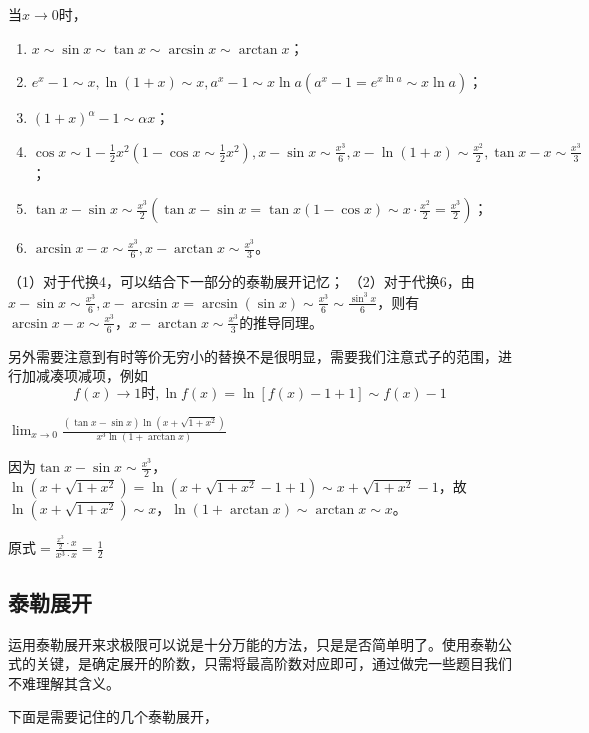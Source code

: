 当$x\to 0$时，
\begin{enumerate}
	\item $x \sim \sin x \sim \tan x \sim \arcsin x \sim \arctan x $；
	\item $e^x-1\sim x,\ln(1+x)\sim x,a^x-1 \sim x \ln a(a^x-1=e^{x \ln a} \sim x \ln a)$；
	\item $(1+x)^\alpha-1 \sim \alpha x$；
	\item $\cos x \sim 1-\frac{1}{2} x^2(1-\cos x \sim \frac{1}{2} x^2),x-\sin x \sim \frac{x^3}{6},x-\ln(1+x)\sim \frac{x^2}{2},\tan x-x\sim \frac{x^3}{3}$；
	\item $\tan x-\sin x \sim \frac{x^3}{2}(\tan x-\sin x=\tan x (1-\cos x)\sim x \cdot \frac{x^2}{2}=\frac{x^3}{2})$；
	\item $\arcsin x-x \sim \frac{x^3}{6},x-\arctan x \sim \frac{x^3}{3}$。
\end{enumerate}

\begin{remark}
	（1）对于代换4，可以结合下一部分的泰勒展开记忆；
	（2）对于代换6，由$x-\sin x \sim \frac{x^3}{6},x-\arcsin x=\arcsin (\sin x)\sim \frac{x^3}{6} \sim \frac{\sin^3 x}{6}$，则有$\arcsin x-x\sim \frac{x^3}{6}$，$x-\arctan x\sim \frac{x^3}{3}$的推导同理。
\end{remark}

另外需要注意到有时等价无穷小的替换不是很明显，需要我们注意式子的范围，进行加减凑项减项，例如$$f(x)\to 1\text{时},\ln f(x)=\ln [f(x)-1+1]\sim f(x)-1$$

\begin{example}
	$\lim_{x \to 0}\frac{(\tan x-\sin x)\ln(x+\sqrt{1+x^2})}{x^3\ln (1+\arctan x)}$
	\begin{solution}
		因为$\tan x-\sin x\sim \frac{x^3}{2}$，$\ln (x+\sqrt{1+x^2})=\ln (x+\sqrt{1+x^2}-1+1)\sim x+\sqrt{1+x^2}-1$，故$\ln (x+\sqrt{1+x^2})\sim x$，$\ln (1+\arctan x)\sim \arctan x \sim x$。

		$\text{原式}=\frac{\frac{x^3}{2}\cdot x}{x^3\cdot x}=\frac{1}{2}$
	\end{solution}
\end{example}

\subsection{泰勒展开}
运用泰勒展开来求极限可以说是十分万能的方法，只是是否简单明了。使用泰勒公式的关键，是确定展开的阶数，只需将最高阶数对应即可，通过做完一些题目我们不难理解其含义。

下面是需要记住的几个泰勒展开，

